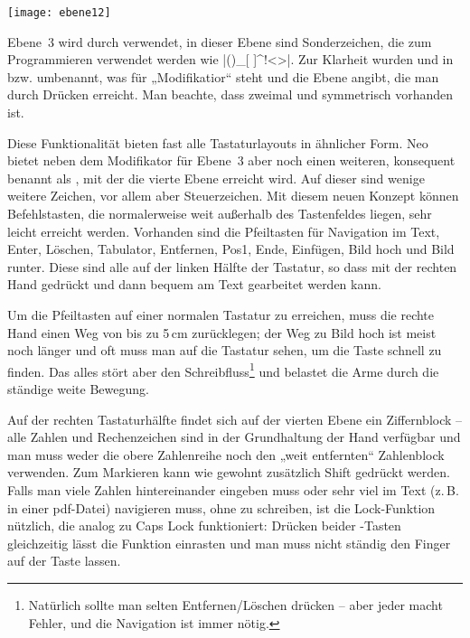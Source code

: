 \documentclass[ngerman]{dtk}
\newcommand{\taste}[1]{\makebox{\textsf{#1}}}
\begin{document}
\begin{center}
\texttt{[image: ebene12]}
\end{center}

Ebene~3 wird durch \taste{Alt Gr} verwendet, in dieser Ebene sind Sonderzeichen, die zum Programmieren verwendet werden wie |()\/{}_[ ]^!<>|. Zur Klarheit wurden \taste{Shift} und \taste{Alt Gr} in \taste{Mod 2} bzw. \taste{Mod 3} umbenannt, was für „Modifikatior“ steht und die Ebene angibt, die man durch Drücken erreicht. Man beachte, dass \taste{Mod 3} zweimal und symmetrisch vorhanden ist.

Diese Funktionalität bieten fast alle Tastaturlayouts in ähnlicher Form. Neo bietet neben dem Modifikator für Ebene~3 aber noch einen weiteren, konsequent benannt als \taste{Mod 4}, mit der die vierte Ebene erreicht wird. Auf dieser sind wenige weitere Zeichen, vor allem aber Steuerzeichen. Mit diesem neuen Konzept können Befehlstasten, die normalerweise weit außerhalb des Tastenfeldes liegen, sehr leicht erreicht werden. Vorhanden sind die Pfeiltasten für Navigation im Text, Enter, Löschen, Tabulator, Entfernen, Pos1, Ende, Einfügen, Bild hoch und Bild runter. Diese sind alle auf der linken Hälfte der Tastatur, so dass mit der rechten Hand \taste{Mod 4} gedrückt und dann bequem am Text gearbeitet werden kann.

Um die Pfeiltasten auf einer normalen Tastatur zu erreichen, muss die rechte Hand einen Weg von bis zu 5\,cm zurücklegen; der Weg zu Bild hoch ist meist noch länger und oft muss man auf die Tastatur sehen, um die Taste schnell zu finden. Das alles stört aber den Schreibfluss\footnote{Natürlich sollte man selten Entfernen/Löschen drücken – aber jeder macht Fehler, und die Navigation ist immer nötig.} und belastet die Arme durch die ständige weite Bewegung.

Auf der rechten Tastaturhälfte findet sich auf der vierten Ebene ein Ziffernblock – alle Zahlen und Rechenzeichen sind in der Grundhaltung der Hand verfügbar und man muss weder die obere Zahlenreihe noch den „weit entfernten“ Zahlenblock verwenden. Zum Markieren kann wie gewohnt zusätzlich Shift gedrückt werden. Falls man viele Zahlen hintereinander eingeben muss oder sehr viel im Text (z.\,B. in einer pdf-Datei) navigieren muss, ohne zu schreiben, ist die Lock-Funktion nützlich, die analog zu Caps Lock funktioniert: Drücken beider \taste{Mod 4}-Tasten gleichzeitig lässt die Funktion einrasten und man muss nicht ständig den Finger auf der Taste lassen.
\end{document}
